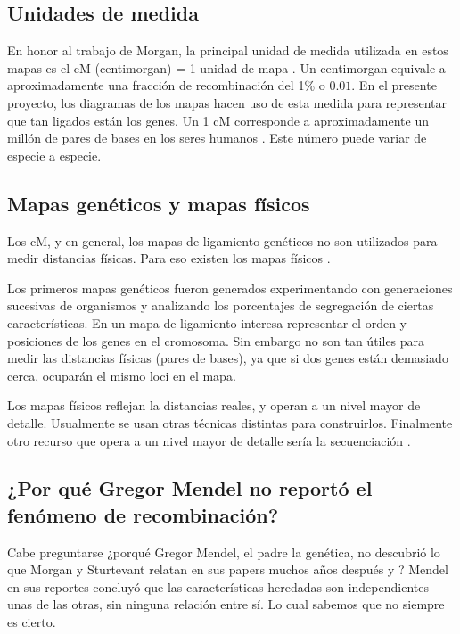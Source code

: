 \documentclass{article}
\begin{document}
	\subsection{Unidades de medida}
	
	En honor al trabajo de Morgan, la principal unidad de medida utilizada en estos mapas es el cM (centimorgan) = 1 unidad de mapa \cite{terwilliger1994handbook}. Un centimorgan equivale a aproximadamente una fracción de recombinación del 1\% o $0.01$. En el presente proyecto, los diagramas de los mapas hacen uso de esta medida para representar que tan ligados están los genes. Un 1 cM corresponde a aproximadamente un millón de pares de bases en los seres humanos \cite{lodish2008molecular}. Este número puede variar de especie a especie.
	
	\subsection{Mapas genéticos y mapas físicos}
	
	Los cM, y en general, los mapas de ligamiento genéticos no son utilizados para medir distancias físicas. Para eso existen los mapas físicos \cite{setubal1997introduction}.
	
	Los primeros mapas genéticos fueron generados experimentando con generaciones sucesivas de organismos y analizando los porcentajes de segregación de ciertas características. En un mapa de ligamiento interesa representar el orden y posiciones de los genes en el cromosoma. Sin embargo no son tan útiles para medir las distancias físicas (pares de bases), ya que si dos genes están demasiado cerca, ocuparán el mismo loci en el mapa.
	
	Los mapas físicos reflejan la distancias reales, y operan a un nivel mayor de detalle. Usualmente se usan otras técnicas distintas para construirlos. Finalmente otro recurso que opera a un nivel mayor de detalle sería la secuenciación \cite{setubal1997introduction}.
	
	\subsection{¿Por qué Gregor Mendel no reportó el fenómeno de recombinación?}
		Cabe preguntarse ¿porqué Gregor Mendel, el padre la genética, no descubrió lo que Morgan y Sturtevant relatan en sus papers muchos años después \cite{morgan1910sex} y \cite{sturtevant1913linear}? Mendel en sus reportes concluyó que las características heredadas son independientes unas de las otras, sin ninguna relación entre sí. Lo cual sabemos que no siempre es cierto.
		
\end{document}
